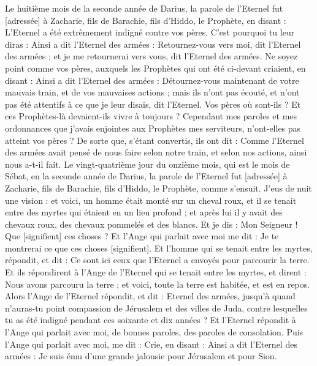 \BFont
\begin{multicols}{2}
\VerseOne{}Le huitième mois de la seconde année de Darius, la parole de l'Eternel fut [adressée] à Zacharie, fils de Barachie, fils d'Hiddo, le Prophète, en disant :
L'Eternel a été extrêmement indigné contre vos pères.
C'est pourquoi tu leur diras : Ainsi a dit l'Eternel des armées : Retournez-vous vers moi, dit l'Eternel des armées ; et je me retournerai vers vous, dit l'Eternel des armées.
Ne soyez point comme vos pères, auxquels les Prophètes qui ont été ci-devant criaient, en disant : Ainsi a dit l'Eternel des armées : Détournez-vous maintenant de votre mauvais train, et de vos mauvaises actions ; mais ils n'ont pas écouté, et n'ont pas été attentifs à ce que je leur disais, dit l'Eternel.
Vos pères où sont-ils ? Et ces Prophètes-là devaient-ils vivre à toujours ?
Cependant mes paroles et mes ordonnances que j'avais enjointes aux Prophètes mes serviteurs, n'ont-elles pas atteint vos pères ? De sorte que, s'étant convertis, ils ont dit : Comme l'Eternel des armées avait pensé de nous faire selon notre train, et selon nos actions, ainsi nous a-t-il fait.
Le vingt-quatrième jour du onzième mois, qui est le mois de Sébat, en la seconde année de Darius, la parole de l'Eternel fut [adressée] à Zacharie, fils de Barachie, fils d'Hiddo, le Prophète, comme s'ensuit.
J'eus de nuit une vision : et voici, un homme était monté sur un cheval roux, et il se tenait entre des myrtes qui étaient en un lieu profond ; et après lui il y avait des chevaux roux, des chevaux pommelés et des blancs.
Et je dis : Mon Seigneur ! Que [signifient] ces choses ? Et l’Ange qui parlait avec moi me dit : Je te montrerai ce que ces choses [signifient].
Et l'homme qui se tenait entre les myrtes, répondit, et dit : Ce sont ici ceux que l'Eternel a envoyés pour parcourir la terre.
Et ils répondirent à l'Ange de l'Eternel qui se tenait entre les myrtes, et dirent : Nous avons parcouru la terre ; et voici, toute la terre est habitée, et est en repos.
Alors l'Ange de l'Eternel répondit, et dit : Eternel des armées, jusqu'à quand n'auras-tu point compassion de Jérusalem et des villes de Juda, contre lesquelles tu as été indigné pendant ces soixante et dix années ?
Et l'Eternel répondit à l'Ange qui parlait avec moi, de bonnes paroles, des paroles de consolation.
Puis l'Ange qui parlait avec moi, me dit : Crie, en disant : Ainsi a dit l'Eternel des armées : Je suis ému d'une grande jalousie pour Jérusalem et pour Sion.

\end{multicols}
